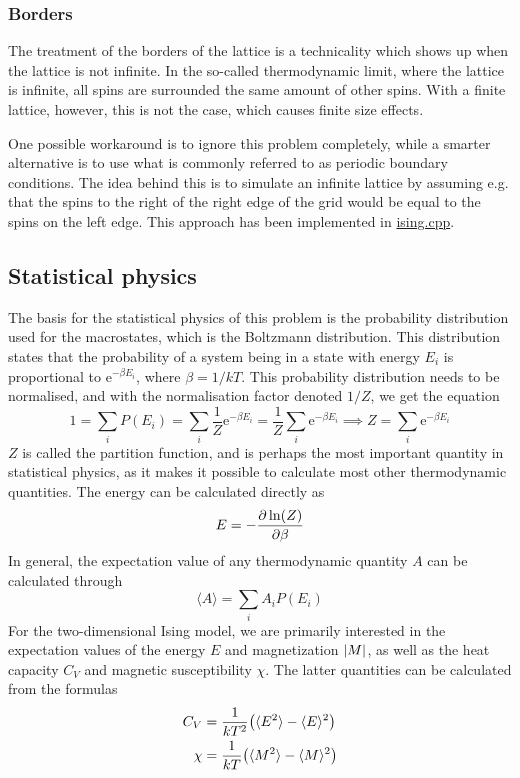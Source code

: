 \documentclass[12pt,english,a4paper]{article}
\renewcommand{\exp}[1]{\mathrm{e}^{#1}}
\newcommand{\program}[1]{\href{https://github.com/anjohan/Offentlig/blob/master/FYS3150/Oblig4/#1}{#1}}
\begin{document}
\subsubsection{Borders}
The treatment of the borders of the lattice is a technicality which shows up when the lattice is not infinite. In the so-called thermodynamic limit, where the lattice is infinite, all spins are surrounded the same amount of other spins. With a finite lattice, however, this is not the case, which causes finite size effects.

One possible workaround is to ignore this problem completely, while a smarter alternative is to use what is commonly referred to as periodic boundary conditions. The idea behind this is to simulate an infinite lattice by assuming e.g. that the spins to the right of the right edge of the grid would be equal to the spins on the left edge. This approach has been implemented in \program{ising.cpp}.

\subsection{Statistical physics}
The basis for the statistical physics of this problem is the probability distribution used for the macrostates, which is the Boltzmann distribution. This distribution states that the probability of a system being in a state with energy \(E_i\) is proportional to \(\exp{-\beta E_i}\), where \(\beta=1/kT\). This probability distribution needs to be normalised, and with the normalisation factor denoted \(1/Z\), we get the equation
\[
1 = \sum_i P(E_i) = \sum_i \frac{1}{Z}\exp{-\beta E_i} = \frac{1}{Z}\sum_i\exp{-\beta E_i} \implies Z = \sum_i \exp{-\beta E_i}
\]
\(Z\) is called the partition function, and is perhaps the most important quantity in statistical physics, as it makes it possible to calculate most other thermodynamic quantities. The energy can be calculated directly as
\[
E = -\pdv{\ln(Z)}{\beta}
\]
In general, the expectation value of any thermodynamic quantity \(A\) can be calculated through
\[
\langle A\rangle = \sum_i A_iP(E_i)
\]
For the two-dimensional Ising model, we are primarily interested in the expectation values of the energy \(E\) and magnetization \(\abs{M}\), as well as the heat capacity \(C_V\) and magnetic susceptibility \(\chi\). The latter quantities can be calculated from the formulas\autocite{compphys}
\begin{alignat*}{2}
C_V &= \frac{1}{kT^2}\qty(\langle E^2\rangle - \langle E\rangle^2)\\
\chi &= \frac{1}{kT}\qty(\langle M^2\rangle - \langle M\rangle^2)
\end{alignat*}
\end{document}
